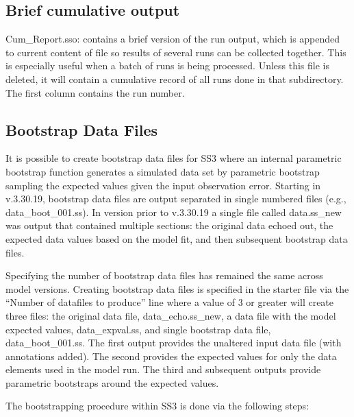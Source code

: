 \subsection{Brief cumulative output}
Cum\_Report.sso: contains a brief version of the run output, which is appended to current content of file so results of several runs can be collected together. This is especially useful when a batch of runs is being processed. Unless this file is deleted, it will contain a cumulative record of all runs done in that subdirectory. The first column contains the run number.  

\hypertarget{bootstrap}{}
\subsection{Bootstrap Data Files}
It is possible to create bootstrap data files for SS3 where an internal parametric bootstrap function generates a simulated data set by parametric bootstrap sampling the expected values given the input observation error. Starting in v.3.30.19, bootstrap data files are output separated in single numbered files (e.g., data\_boot\_001.ss). In version prior to v.3.30.19 a single file called data.ss\_new was output that contained multiple sections:  the original data echoed out, the expected data values based on the model fit, and then subsequent bootstrap data files. 

Specifying the number of bootstrap data files has remained the same across model versions. Creating bootstrap data files is specified in the starter file via the ``Number of datafiles to produce'' line where a value of 3 or greater will create three files: the original data file, data\_echo.ss\_new, a data file with the model expected values, data\_expval.ss, and single bootstrap data file, data\_boot\_001.ss. The first output provides the unaltered input data file (with annotations added). The second provides the expected values for only the data elements used in the model run. The third and subsequent outputs provide parametric bootstraps around the expected values. 

The bootstrapping procedure within SS3 is done via the following steps:

